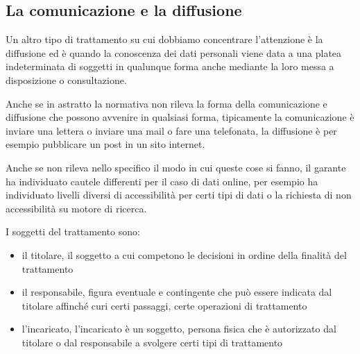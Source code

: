 \subsection{La comunicazione e la diffusione}

Un altro tipo di trattamento su cui dobbiamo concentrare l'attenzione è la diffusione ed è quando la conoscenza dei dati personali viene data a una platea indeterminata di soggetti in qualunque forma anche mediante la loro messa a disposizione o consultazione.

Anche se in astratto la normativa non rileva la forma della comunicazione e diffusione che possono avvenire in qualsiasi forma, tipicamente la comunicazione è inviare una lettera o inviare una mail o fare una telefonata, la diffusione è per esempio pubblicare un post in un sito internet. 

Anche se non rileva nello specifico il modo in cui queste cose si fanno, il garante ha individuato cautele differenti per il caso di dati online, per esempio ha individuato livelli diversi di accessibilità per certi tipi di dati o la richiesta di non accessibilità su motore di ricerca. 

I soggetti del trattamento sono:

\begin{itemize}
    \item il titolare, il soggetto a cui competono le decisioni in ordine della finalità del trattamento
    \item il responsabile, figura eventuale e contingente che può essere indicata dal titolare affinché curi certi passaggi, certe operazioni di trattamento
    \item l'incaricato, l'incaricato è un soggetto, persona fisica che è autorizzato dal titolare o dal responsabile a svolgere certi tipi di trattamento
\end{itemize}

